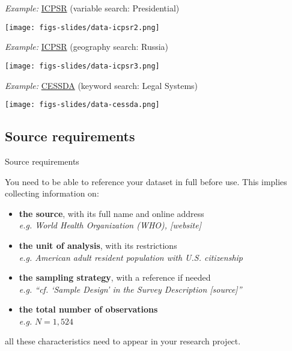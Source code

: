 \documentclass{beamer}
\begin{document}
	\begin{frame}[t]{\textit{Example:} \href{http://www.icpsr.umich.edu/}{ICPSR} (variable search: Presidential)}

	\texttt{[image: figs-slides/data-icpsr2.png]}

	\end{frame}
	
	\begin{frame}[t]{\textit{Example:} \href{http://www.icpsr.umich.edu/}{ICPSR} (geography search: Russia)}

	\texttt{[image: figs-slides/data-icpsr3.png]}

	\end{frame}

	\begin{frame}[t]{\textit{Example:} \href{http://www.cessda.org/}{CESSDA} (keyword search: Legal Systems)}

	\texttt{[image: figs-slides/data-cessda.png]}

	\end{frame}
		


	\subsection{Source requirements}

	\begin{frame}[t]{Source requirements}
	
	You need to be able to reference your dataset in full before use. This implies collecting information on:

		\begin{itemize}
			\item \textbf{the source}, with its full name and online address\\
			\textit{e.g. World Health Organization (WHO), [website]}
			
			\item \textbf{the unit of analysis}, with its restrictions\\
			\textit{e.g. American adult resident population with U.S. citizenship}
			
			\item \textbf{the sampling strategy}, with a reference if needed\\
			\textit{e.g. ``cf. `Sample Design' in the Survey Description [source]''}
			
			\item \textbf{the total number of observations}\\
			\textit{e.g.} $N=1,524$
		\end{itemize}
			
	 all these characteristics need to appear in your research project.
	
	\end{frame}
	
\end{document}
